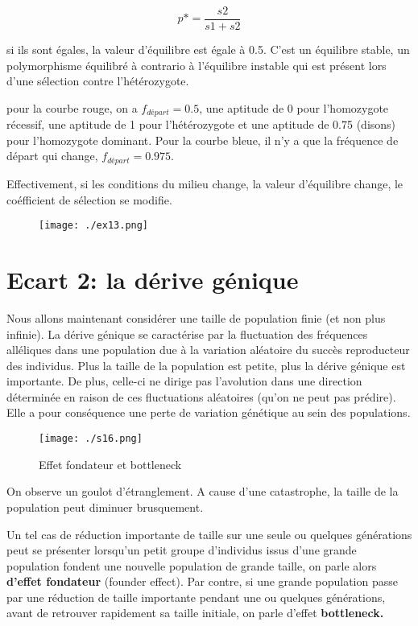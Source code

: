 \documentclass{article}
\begin{document}
\begin{equation}
p* = \frac{s2}{s1+s2}
\end{equation}

si ils sont égales, la valeur d'équilibre est égale à 0.5. C'est un équilibre stable, un polymorphisme équilibré à contrario à l'équilibre instable qui est présent lors d'une sélection contre l'hétérozygote.

pour la courbe rouge, on a $f_{départ}=0.5$, une aptitude de 0 pour l'homozygote récessif, une aptitude de 1 pour l'hétérozygote et une aptitude de 0.75 (disons) pour l'homozygote dominant. Pour la courbe bleue, il n'y a que la fréquence de départ qui change, $f_{départ}=0.975$.

Effectivement, si les conditions du milieu change, la valeur d'équilibre change, le coéfficient de sélection se modifie.



\pagebreak

\begin{figure}[H]
\texttt{[image: ./ex13.png]}
\end{figure}

\section{Ecart 2: la dérive génique}

Nous allons maintenant considérer une taille de population finie (et non plus infinie). La dérive génique se caractérise par la fluctuation des fréquences alléliques dans une population due à la variation aléatoire du succès reproducteur des individus. Plus la taille de la population est petite, plus la dérive génique est importante. De plus, celle-ci ne dirige pas l'avolution dans une direction déterminée en raison de ces fluctuations aléatoires (qu'on ne peut pas prédire). Elle a pour conséquence une perte de variation génétique au sein des populations. 

\begin{figure}[H]
\texttt{[image: ./s16.png]}
\caption{Effet fondateur et bottleneck}
\end{figure}

On observe un goulot d'étranglement. A cause d'une catastrophe, la taille de la population peut diminuer brusquement.

Un tel cas de réduction importante de taille sur une seule ou quelques générations peut se présenter lorsqu’un petit groupe d’individus issus d’une grande population fondent une nouvelle population de grande taille, on parle alors \textbf{d’effet fondateur} (founder effect). Par contre, si une grande population passe par une réduction de taille importante pendant une ou quelques générations, avant de retrouver rapidement sa taille initiale, on parle d’effet \textbf{bottleneck.}
\end{document}
